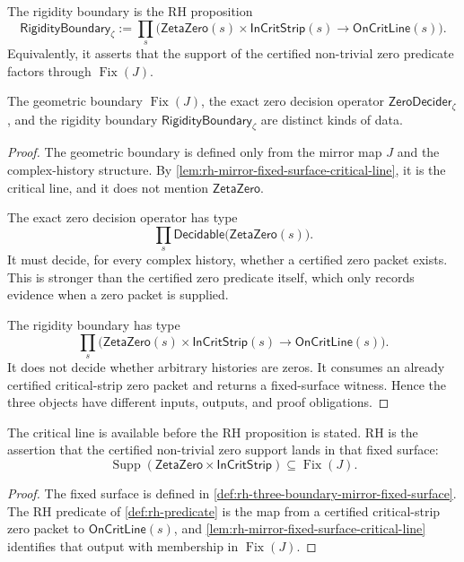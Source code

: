 \begin{definition}
\label{def:rh-rigidity-boundary}
The rigidity boundary is the RH proposition
$$
\mathsf{RigidityBoundary}_{\zeta}
:=
\prod_s
\bigl(
\mathsf{ZetaZero}(s)
\times
\mathsf{InCritStrip}(s)
\to
\mathsf{OnCritLine}(s)
\bigr).
$$
Equivalently, it asserts that the support of the certified non-trivial zero
predicate factors through $\operatorname{Fix}(J)$.
\end{definition}

\begin{theorem}
\label{thm:rh-three-boundary-separation}
The geometric boundary $\operatorname{Fix}(J)$, the exact zero decision
operator $\mathsf{ZeroDecider}_{\zeta}$, and the rigidity boundary
$\mathsf{RigidityBoundary}_{\zeta}$ are distinct kinds of data.
\end{theorem}

\begin{proof}
The geometric boundary is defined only from the mirror map $J$ and the
complex-history structure. By
\autoref{lem:rh-mirror-fixed-surface-critical-line}, it is the critical
line, and it does not mention $\mathsf{ZetaZero}$.

The exact zero decision operator has type
$$
\prod_s\mathsf{Decidable}\bigl(\mathsf{ZetaZero}(s)\bigr).
$$
It must decide, for every complex history, whether a certified zero packet
exists. This is stronger than the certified zero predicate itself, which
only records evidence when a zero packet is supplied.

The rigidity boundary has type
$$
\prod_s
\bigl(
\mathsf{ZetaZero}(s)
\times
\mathsf{InCritStrip}(s)
\to
\mathsf{OnCritLine}(s)
\bigr).
$$
It does not decide whether arbitrary histories are zeros. It consumes an
already certified critical-strip zero packet and returns a fixed-surface
witness. Hence the three objects have different inputs, outputs, and proof
obligations.
\end{proof}

\begin{corollary}
\label{cor:rh-critical-line-target-fixed-surface}
The critical line is available before the RH proposition is stated. RH is
the assertion that the certified non-trivial zero support lands in that
fixed surface:
$$
\operatorname{Supp}(\mathsf{ZetaZero}\times\mathsf{InCritStrip})
\subseteq
\operatorname{Fix}(J).
$$
\end{corollary}

\begin{proof}
The fixed surface is defined in
\autoref{def:rh-three-boundary-mirror-fixed-surface}. The RH predicate of
\autoref{def:rh-predicate} is the map from a certified critical-strip zero
packet to $\mathsf{OnCritLine}(s)$, and
\autoref{lem:rh-mirror-fixed-surface-critical-line} identifies that output
with membership in $\operatorname{Fix}(J)$.
\end{proof}

